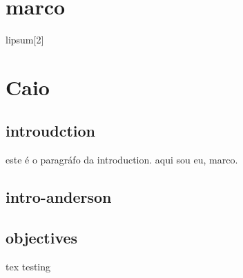 
    \section{marco}
    lipsum[2]
    \section{Caio}


    \subsection{introudction}
    este é o paragráfo da introduction.
    aqui sou eu, marco.

    \subsection{intro-anderson}

    \subsection{objectives}
    tex testing
    



